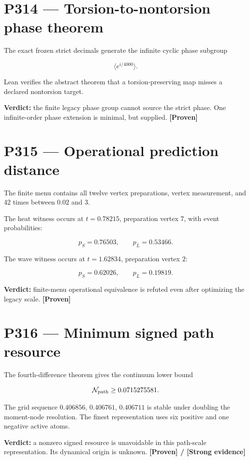 \documentclass[11pt,a4paper,openany]{report}
\newcommand{\statusProven}{\textcolor{fingreen}{[Proven]}}
\begin{document}
\section{P314 --- Torsion-to-nontorsion phase theorem}

The exact frozen strict decimals generate the infinite cyclic phase subgroup

\[
\langle e^{i/4000}\rangle.
\]

Lean verifies the abstract theorem that a torsion-preserving map misses a declared nontorsion target.

\textbf{Verdict:} the finite legacy phase group cannot source the strict phase. One infinite-order phase extension is minimal, but supplied. \textbf{\statusProven{}}

\section{P315 --- Operational prediction distance}

The finite menu contains all twelve vertex preparations, vertex measurement, and 42 times between \(0.02\) and \(3\).

The heat witness occurs at \(t=0.78215\), preparation vertex \(7\), with event probabilities:

\[
p_S=0.76503,
\qquad
p_L=0.53466.
\]

The wave witness occurs at \(t=1.62834\), preparation vertex \(2\):

\[
p_S=0.62026,
\qquad
p_L=0.19819.
\]

\textbf{Verdict:} finite-menu operational equivalence is refuted even after optimizing the legacy scale. \textbf{\statusProven{}}

\section{P316 --- Minimum signed path resource}

The fourth-difference theorem gives the continuum lower bound

\[
\mathcal N_{\rm path}\ge0.0715275581.
\]

The grid sequence \(0.406856\), \(0.406761\), \(0.406711\) is stable under doubling the moment-node resolution. The finest representation uses six positive and one negative active atoms.

\textbf{Verdict:} a nonzero signed resource is unavoidable in this path-scale representation. Its dynamical origin is unknown. \textbf{\statusProven{} /\allowbreak{} [Strong evidence]}
\end{document}
